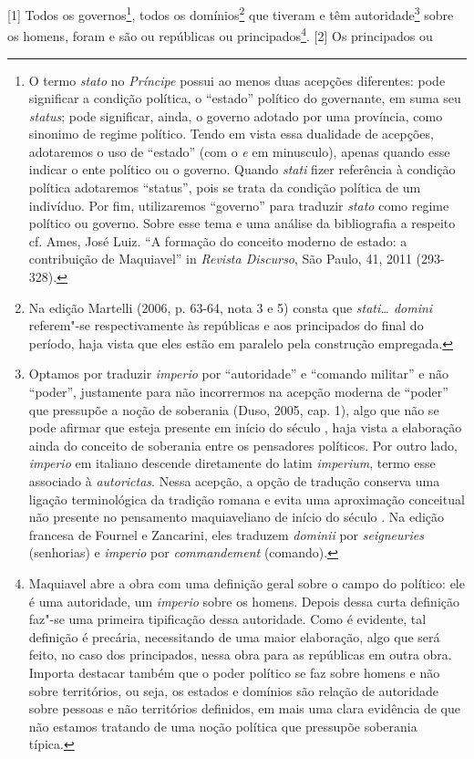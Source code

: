 {[}1{]} Todos os governos\footnote{O termo \emph{stato} no
  \emph{Príncipe} possui ao menos duas acepções diferentes: pode
  significar a condição política, o ``estado'' político do governante,
  em suma seu \emph{status}; pode significar, ainda, o governo adotado
  por uma província, como sinonimo de regime político. Tendo em vista
  essa dualidade de acepções, adotaremos o uso de ``estado'' (com o
  \emph{e} em minusculo), apenas quando esse indicar o ente político ou
  o governo. Quando \emph{stati} fizer referência à condição política
  adotaremos ``status'', pois se trata da condição política de um
  indivíduo. Por fim, utilizaremos ``governo'' para traduzir
  \emph{stato} como regime político ou governo. Sobre esse tema e uma
  análise da bibliografia a respeito cf. Ames, José Luiz. ``A formação
  do conceito moderno de estado: a contribuição de Maquiavel'' in
  \emph{Revista Discurso}, São Paulo, 41, 2011 (293-328).}, todos os
domínios\footnote{Na edição Martelli (2006, p. 63-64, nota 3 e 5) consta
  que \emph{stati\ldots{} domini} referem"-se respectivamente às repúblicas e
  aos principados do final do período, haja vista que eles estão em
  paralelo pela construção empregada.} que tiveram e têm
autoridade\footnote{Optamos por traduzir \emph{imperio} por
  ``autoridade'' e ``comando militar'' e não ``poder'', justamente para
  não incorrermos na acepção moderna de ``poder'' que pressupõe a noção
  de soberania (Duso, 2005, cap. 1), algo que não se pode afirmar que
  esteja presente em início do século , haja vista a elaboração ainda
  do conceito de soberania entre os pensadores políticos. Por outro
  lado, \emph{imperio} em italiano descende diretamente do latim
  \emph{imperium}, termo esse associado à \emph{autorictas}. Nessa
  acepção, a opção de tradução conserva uma ligação terminológica da
  tradição romana e evita uma aproximação conceitual não presente no
  pensamento maquiaveliano de início do século . Na edição francesa
  de Fournel e Zancarini, eles traduzem \emph{dominii} por
  \emph{seigneuries} (senhorias) e \emph{imperio} por
  \emph{commandement} (comando).} sobre os homens, foram e são ou
repúblicas ou principados\footnote{Maquiavel abre a obra com uma
  definição geral sobre o campo do político: ele é uma autoridade, um
  \emph{imperio} sobre os homens. Depois dessa curta definição faz"-se
  uma primeira tipificação dessa autoridade. Como é evidente, tal
  definição é precária, necessitando de uma maior elaboração, algo que
  será feito, no caso dos principados, nessa obra para as repúblicas em
  outra obra. Importa destacar também que o poder político se faz sobre
  homens e não sobre territórios, ou seja, os estados e domínios são
  relação de autoridade sobre pessoas e não territórios definidos, em
  mais uma clara evidência de que não estamos tratando de uma noção
  política que pressupõe soberania típica.}. {[}2{]} Os principados ou
